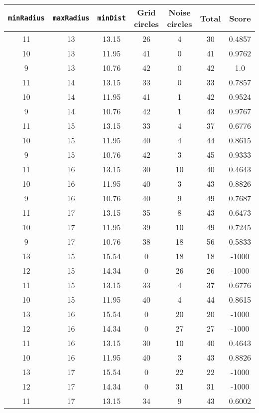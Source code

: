 \documentclass[letterpaper, 12pt]{article}
\begin{document}
\begin{longtable}{|c|c|c|c|c|c|c|}
\hline
\textbf{\texttt{minRadius}} & \textbf{\texttt{maxRadius}} & \textbf{\texttt{minDist}} & \textbf{Grid circles} & \textbf{Noise circles} & \textbf{Total} & \textbf{Score} \\
\hline
11 & 13 & 13.15 & 26 & 4 & 30 & 0.4857 \\
\hline
10 & 13 & 11.95 & 41 & 0 & 41 & 0.9762 \\
\hline
9 & 13 & 10.76 & 42 & 0 & 42 & 1.0 \\
\hline
11 & 14 & 13.15 & 33 & 0 & 33 & 0.7857 \\
\hline
10 & 14 & 11.95 & 41 & 1 & 42 & 0.9524 \\
\hline
9 & 14 & 10.76 & 42 & 1 & 43 & 0.9767 \\
\hline
11 & 15 & 13.15 & 33 & 4 & 37 & 0.6776 \\
\hline
10 & 15 & 11.95 & 40 & 4 & 44 & 0.8615 \\
\hline
9 & 15 & 10.76 & 42 & 3 & 45 & 0.9333 \\
\hline
11 & 16 & 13.15 & 30 & 10 & 40 & 0.4643 \\
\hline
10 & 16 & 11.95 & 40 & 3 & 43 & 0.8826 \\
\hline
9 & 16 & 10.76 & 40 & 9 & 49 & 0.7687 \\
\hline
11 & 17 & 13.15 & 35 & 8 & 43 & 0.6473 \\
\hline
10 & 17 & 11.95 & 39 & 10 & 49 & 0.7245 \\
\hline
9 & 17 & 10.76 & 38 & 18 & 56 & 0.5833 \\
\hline
13 & 15 & 15.54 & 0 & 18 & 18 & -1000 \\
\hline
12 & 15 & 14.34 & 0 & 26 & 26 & -1000 \\
\hline
11 & 15 & 13.15 & 33 & 4 & 37 & 0.6776 \\
\hline
10 & 15 & 11.95 & 40 & 4 & 44 & 0.8615 \\
\hline
13 & 16 & 15.54 & 0 & 20 & 20 & -1000 \\
\hline
12 & 16 & 14.34 & 0 & 27 & 27 & -1000 \\
\hline
11 & 16 & 13.15 & 30 & 10 & 40 & 0.4643 \\
\hline
10 & 16 & 11.95 & 40 & 3 & 43 & 0.8826 \\
\hline
13 & 17 & 15.54 & 0 & 22 & 22 & -1000 \\
\hline
12 & 17 & 14.34 & 0 & 31 & 31 & -1000 \\
\hline
11 & 17 & 13.15 & 34 & 9 & 43 & 0.6002 \\
\hline

\end{longtable}
\end{document}
